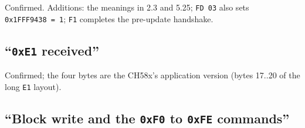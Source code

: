Confirmed. Additions: the meanings in 2.3 and 5.25; \texttt{FD\ 03} also
sets \texttt{0x1FFF9438\ =\ 1}; \texttt{F1} completes the pre-update
handshake.

\subsection{\texorpdfstring{``\texttt{0xE1}
received''}{``0xE1 received''}}\label{xe1-received}

Confirmed; the four bytes are the CH58x's application version (bytes
17..20 of the long \texttt{E1} layout).

\subsection{\texorpdfstring{``Block write and the \texttt{0xF0} to
\texttt{0xFE}
commands''}{``Block write and the 0xF0 to 0xFE commands''}}\label{block-write-and-the-0xf0-to-0xfe-commands}

